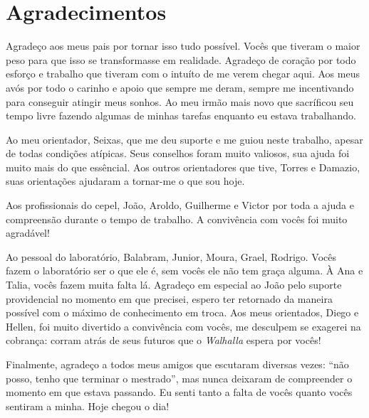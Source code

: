 \chapter*{Agradecimentos}

Agradeço aos meus pais por tornar isso tudo possível. Vocês que
tiveram o maior peso para que isso se transformasse em realidade.
Agradeço de coração por todo esforço e trabalho que tiveram com o
intuíto de me verem chegar aqui. Aos meus avós por todo o carinho e
apoio que sempre me deram, sempre me incentivando para conseguir
atingir meus sonhos. Ao meu irmão mais novo que sacríficou seu tempo
livre fazendo algumas de minhas tarefas enquanto eu estava
trabalhando.

Ao meu orientador, Seixas, que me deu suporte e me guiou neste
trabalho, apesar de todas condições atípicas. Seus conselhos foram
muito valiosos, sua ajuda foi muito mais do que essêncial. Aos outros
orientadores que tive, Torres e Damazio, suas orientações ajudaram a
tornar-me o que sou hoje.

Aos profissionais do \acrshort{cepel}, João, Aroldo, Guilherme e Victor por
toda a ajuda e compreensão durante o tempo de trabalho. A convivência
com vocês foi muito agradável!

Ao pessoal do laboratório, Balabram, Junior, Moura, Grael, Rodrigo.
Vocês fazem o laboratório ser o que ele é, sem vocês ele não tem graça
alguma. À Ana e Talia, vocês fazem muita falta lá. Agradeço em
especial ao João pelo suporte providencial no momento em que precisei,
espero ter retornado da maneira possível com o máximo de conhecimento
em troca. Aos meus orientados, Diego e Hellen, foi muito divertido a
convivência com vocês, me desculpem se exagerei na cobrança: corram
atrás de seus futuros que o \emph{Walhalla} espera por vocês!

Finalmente, agradeço a todos meus amigos que escutaram diversas vezes:
``não posso, tenho que terminar o mestrado'', mas nunca deixaram de
compreender o momento em que estava passando. Eu senti tanto a falta
de vocês quanto vocês sentiram a minha. Hoje chegou o dia!

